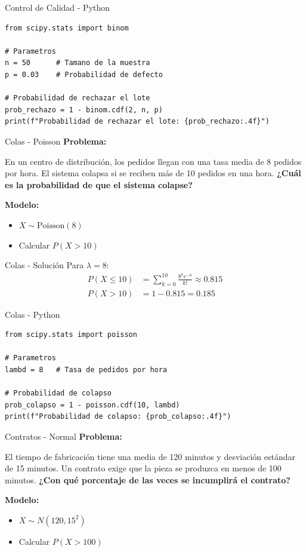 \documentclass{beamer}
\begin{document}
\begin{frame}[fragile]{Control de Calidad - Python}
    \begin{lstlisting}
from scipy.stats import binom

# Parametros
n = 50      # Tamano de la muestra
p = 0.03    # Probabilidad de defecto

# Probabilidad de rechazar el lote
prob_rechazo = 1 - binom.cdf(2, n, p)
print(f"Probabilidad de rechazar el lote: {prob_rechazo:.4f}")
    \end{lstlisting}
\end{frame}

\begin{frame}{Colas - Poisson}
    \textbf{Problema:}
    
    En un centro de distribución, los pedidos llegan con una tasa media de 8 pedidos por hora. El sistema colapsa si se reciben más de 10 pedidos en una hora. \textbf{¿Cuál es la probabilidad de que el sistema colapse?}
    
    \textbf{Modelo:}
    \begin{itemize}
        \item $X \sim \text{Poisson}(8)$
        \item Calcular $P(X > 10)$
    \end{itemize}
\end{frame}

\begin{frame}{Colas - Solución}
    Para $\lambda = 8$:
    \begin{align*}
        P(X \leq 10) &= \sum_{k=0}^{10} \frac{8^k e^{-8}}{k!} \approx 0.815 \\
        P(X > 10) &= 1 - 0.815 = 0.185
    \end{align*}
\end{frame}

\begin{frame}[fragile]{Colas - Python}
    \begin{lstlisting}
from scipy.stats import poisson

# Parametros
lambd = 8   # Tasa de pedidos por hora

# Probabilidad de colapso
prob_colapso = 1 - poisson.cdf(10, lambd)
print(f"Probabilidad de colapso: {prob_colapso:.4f}")
    \end{lstlisting}
\end{frame}

\begin{frame}{Contratos - Normal}
    \textbf{Problema:}
    
    El tiempo de fabricación tiene una media de 120 minutos y desviación estándar de 15 minutos. Un contrato exige que la pieza se produzca en menos de 100 minutos. \textbf{¿Con qué porcentaje de las veces se incumplirá el contrato?}
    
    \textbf{Modelo:}
    \begin{itemize}
        \item $X \sim N(120, 15^2)$
        \item Calcular $P(X > 100)$
    \end{itemize}
\end{frame}
\end{document}
